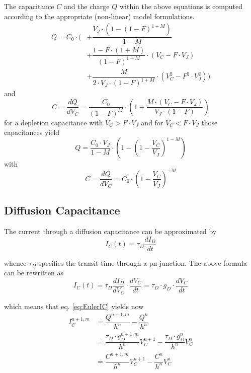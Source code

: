 The capacitance $C$ and the charge $Q$ within the above equations is
computed according to the appropriate (non-linear) model formulations.
\begin{equation}
\begin{split}
Q = C_0\cdot \Biggl(
& + \dfrac{V_J\cdot \left(1- \left(1 - F\right)^{1-M}\right)}{1-M}\\
& + \dfrac{1 - F\cdot\left(1 + M\right)}{\left(1-F\right)^{1+M}} \cdot \left(V_C - F\cdot V_J\right)\\
& + \dfrac{M}{2\cdot V_J \cdot \left(1-F\right)^{1+M}} \cdot\left(V_C^2 - F^2\cdot V_J^2\right) \Biggr)
\end{split}
\end{equation}
and
\begin{equation}
C = \dfrac{d Q}{d V_C} = \dfrac{C_0}{\left(1 - F\right)^M}\cdot \left(1 + \dfrac{M\cdot \left(V_C - F\cdot V_J\right)}{V_J\cdot \left(1 - F\right)}\right)
\end{equation}
for a depletion capacitance with $V_C > F\cdot V_J$ and for $V_C <
F\cdot V_J$ those capacitances yield
\begin{equation}
Q = \dfrac{C_0\cdot V_J}{1-M}\cdot\left(1-\left(1 - \dfrac{V_C}{V_J}\right)^{1-M}\right)
\end{equation}
with
\begin{equation}
C = \dfrac{d Q}{d V_C} = C_{0}\cdot \left(1 - \dfrac{V_{C}}{V_{J}}\right)^{-M}
\end{equation}

\subsection{Diffusion Capacitance}

The current through a diffusion capacitance can be approximated by
\begin{equation}
I_C(t) = \tau_D \dfrac{d I_D}{d t}
\end{equation}

whence $\tau_D$ specifies the transit time through a pn-junction.  The
above formula can be rewritten as
\begin{equation}
I_C(t) = \tau_D \dfrac{d I_D}{d V_C}\cdot \dfrac{d V_C}{d t} = \tau_D \cdot g_D \cdot \dfrac{d V_C}{d t}
\end{equation}

which means that eq. \eqref{eq:EulerIC} yields now
\begin{equation}
\begin{split}
I_C^{n+1,m} &= \dfrac{Q^{n+1,m}}{h^{n}} - \dfrac{Q^{n}}{h^{n}}\\
&= \dfrac{\tau_D\cdot g_D^{n+1,m}}{h^{n}} V_C^{n+1} - \dfrac{\tau_D\cdot g_D^{n}}{h^{n}} V_C^{n}\\
&= \dfrac{C^{n+1,m}}{h^{n}} V_C^{n+1} - \dfrac{C^{n}}{h^{n}} V_C^{n}
\end{split}
\end{equation}

